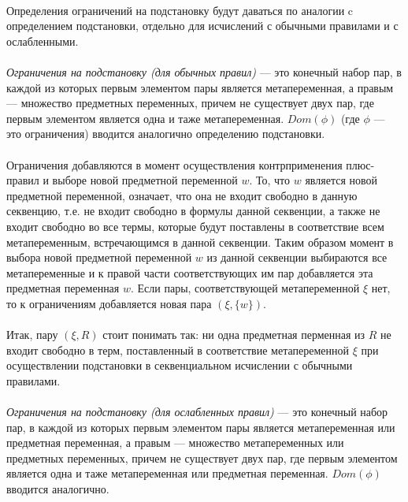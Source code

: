 \documentclass{cw1}
\begin{document}
\paragraph{}
Определения ограничений на подстановку будут даваться по аналогии c определением
подстановки, отдельно для исчислений с обычными правилами и с ослабленными.
\paragraph{}
\textit{Ограничения на подстановку (для обычных правил)} --- это конечный набор пар, в каждой из
которых первым элементом пары является метапеременная, а правым --- множество предметных переменных,
причем не существует двух пар, где первым элементом является одна и таже метапеременная.
$Dom(\phi)$ (где $\phi$ --- это ограничения) вводится аналогично определению подстановки.
\paragraph{}
Ограничения добавляются в момент осуществления контрприменения плюс-правил и выборе новой
предметной переменной $w$. То, что $w$ является новой предметной переменной, означает, что она
не входит свободно в данную секвенцию, т.е. не входит свободно в формулы данной секвенции, а также не
входит свободно во все термы, которые будут поставлены в соответствие всем метапеременным,
встречающимся в данной секвенции. Таким образом момент в выбора новой предметной переменной
$w$ из данной секвенции выбираются все метапеременные и к правой части соответствующих им пар
добавляется эта предметная переменная $w$. Если пары, соответствующей метапеременной $\xi$ нет,
то к ограничениям добавляется новая пара $(\xi,\{w\})$.
\paragraph{}
Итак, пару $(\xi,R)$ стоит понимать так: ни одна предметная перменная из
$R$ не входит свободно в терм, поставленный в соответствие метапеременной $\xi$ при осуществлении
подстановки в секвенциальном исчислении с обычными правилами.
\paragraph{}
\textit{Ограничения на подстановку (для ослабленных правил)} --- это конечный набор пар, в каждой из
которых первым элементом пары является метапеременная или предметная переменная, а правым ---
множество  метапеременных или предметных переменных,
причем не существует двух пар, где первым элементом является одна и таже метапеременная или предметная
переменная. $Dom(\phi)$ вводится аналогично.
\end{document}
